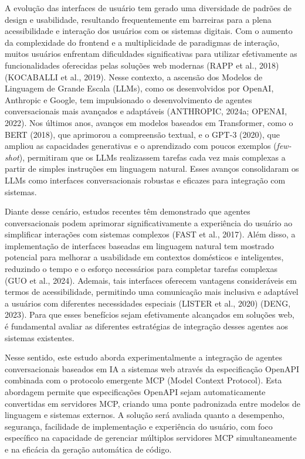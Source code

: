 \documentclass[
]{article}
\begin{document}
A evolução das interfaces de usuário tem gerado uma diversidade de
padrões de design e usabilidade, resultando frequentemente em barreiras
para a plena acessibilidade e interação dos usuários com os sistemas
digitais. Com o aumento da complexidade do frontend e a multiplicidade
de paradigmas de interação, muitos usuários enfrentam dificuldades
significativas para utilizar efetivamente as funcionalidades oferecidas
pelas soluções web modernas (RAPP et al., 2018) (KOCABALLI et al.,
2019). Nesse contexto, a ascensão dos Modelos de Linguagem de Grande
Escala (LLMs), como os desenvolvidos por OpenAI, Anthropic e Google, tem
impulsionado o desenvolvimento de agentes conversacionais mais avançados
e adaptáveis (ANTHROPIC, 2024a; OPENAI, 2022). Nos últimos anos, avanços
em modelos baseados em Transformer, como o BERT (2018), que aprimorou a
compreensão textual, e o GPT-3 (2020), que ampliou as capacidades
generativas e o aprendizado com poucos exemplos (\emph{few-shot}),
permitiram que os LLMs realizassem tarefas cada vez mais complexas a
partir de simples instruções em linguagem natural. Esses avanços
consolidaram os LLMs como interfaces conversacionais robustas e eficazes
para integração com sistemas.

Diante desse cenário, estudos recentes têm demonstrado que agentes
conversacionais podem aprimorar significativamente a experiência do
usuário ao simplificar interações com sistemas complexos (FAST et al.,
2017). Além disso, a implementação de interfaces baseadas em linguagem
natural tem mostrado potencial para melhorar a usabilidade em contextos
domésticos e inteligentes, reduzindo o tempo e o esforço necessários
para completar tarefas complexas (GUO et al., 2024). Ademais, tais
interfaces oferecem vantagens consideráveis em termos de acessibilidade,
permitindo uma comunicação mais inclusiva e adaptável a usuários com
diferentes necessidades especiais (LISTER et al., 2020) (DENG, 2023).
Para que esses benefícios sejam efetivamente alcançados em soluções web,
é fundamental avaliar as diferentes estratégias de integração desses
agentes aos sistemas existentes.

Nesse sentido, este estudo aborda experimentalmente a integração de
agentes conversacionais baseados em IA a sistemas web através da
especificação OpenAPI combinada com o protocolo emergente MCP (Model
Context Protocol). Esta abordagem permite que especificações OpenAPI
sejam automaticamente convertidas em servidores MCP, criando uma ponte
padronizada entre modelos de linguagem e sistemas externos. A solução
será avaliada quanto a desempenho, segurança, facilidade de
implementação e experiência do usuário, com foco específico na
capacidade de gerenciar múltiplos servidores MCP simultaneamente e na
eficácia da geração automática de código.
\end{document}
